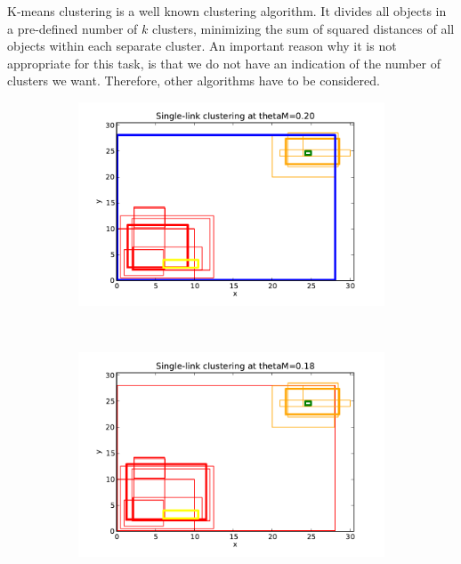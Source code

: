 K-means clustering is a well known clustering algorithm. It divides all objects in a pre-defined number of $k$ clusters, minimizing the sum of squared distances of all objects within each separate cluster. An important reason why it is not appropriate for this task, is that we do not have an indication of the number of clusters we want. Therefore, other algorithms have to be considered.

\begin{figure}[hbt]
    \begin{subfigure}[b]{0.32\textwidth}
            \centering
            \includegraphics[width=\textwidth]{visSL020}
            \caption{}
            \label{fig:slvqs_qs1}
    \end{subfigure}
    ~ %
    \begin{subfigure}[b]{0.32\textwidth}
            \centering
            \includegraphics[width=\textwidth]{visSL018}

\end{subfigure}
\end{figure}
